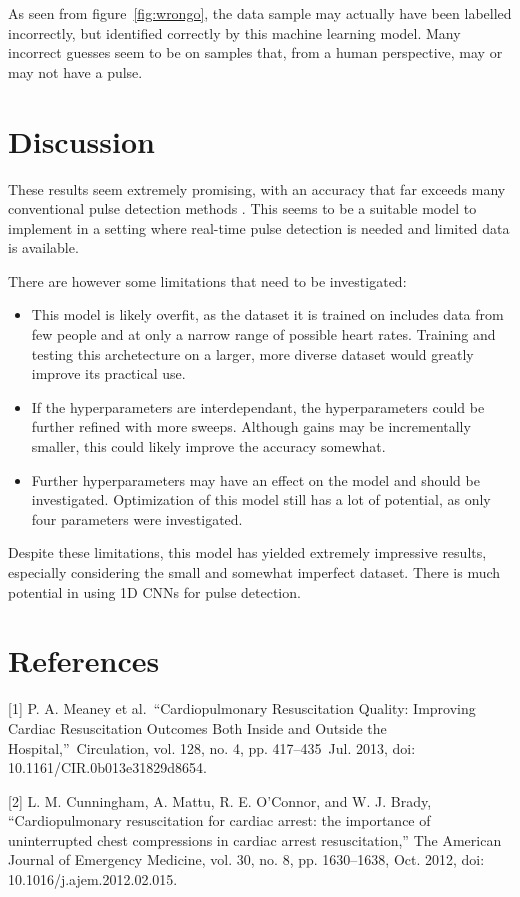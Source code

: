 \documentclass{article}
\begin{document}
As seen from figure~\ref{fig:wrongo}, the data sample may actually have been labelled incorrectly, but identified correctly by this machine learning model. Many incorrect guesses seem to be on samples that, from a human perspective, may or may not have a pulse.


\section{Discussion}

These results seem extremely promising, with an accuracy that far exceeds many conventional pulse detection methods . This seems to be a suitable model to implement in a setting where real-time pulse detection is needed and limited data is available. 

There are however some limitations that need to be investigated:
\begin{itemize}

    \item This model is likely overfit, as the dataset it is trained on includes data from few people and at only a narrow range of possible heart rates. Training and testing this archetecture on a larger, more diverse dataset would greatly improve its practical use.
    \item If the hyperparameters are interdependant, the hyperparameters could be further refined with more sweeps. Although gains may be incrementally smaller, this could likely improve the accuracy somewhat. 
    \item Further hyperparameters may have an effect on the model and should be investigated. Optimization of this model still has a lot of potential, as only four parameters were investigated.
    
\end{itemize}

Despite these limitations, this model has yielded extremely impressive results, especially considering the small and somewhat imperfect dataset. There is much potential in using 1D CNNs for pulse detection.

\newpage
\section*{References}
{
\small

[1]	P. A. Meaney et al.\ “Cardiopulmonary Resuscitation Quality: Improving Cardiac Resuscitation Outcomes Both Inside and Outside the Hospital,”\ Circulation, vol. 128, no. 4, pp. 417–435\ Jul. 2013, doi: 10.1161/CIR.0b013e31829d8654.

[2]	L. M. Cunningham, A. Mattu, R. E. O’Connor, and W. J. Brady, “Cardiopulmonary resuscitation for cardiac arrest: the importance of uninterrupted chest compressions in cardiac arrest resuscitation,” The American Journal of Emergency Medicine, vol. 30, no. 8, pp. 1630–1638, Oct. 2012, doi: 10.1016/j.ajem.2012.02.015.
}
\end{document}

